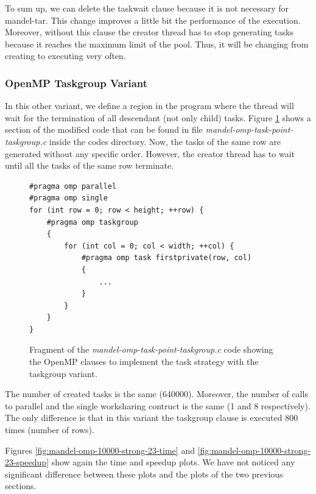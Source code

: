 \documentclass[12pt, a4paper]{article}
\begin{document}
To sum up, we can delete the taskwait clause because it is not necessary for mandel-tar. This change improves a little bit the performance of the execution. Moreover, without this clause the creator thread has to stop generating tasks because it reaches the maximum limit of the pool. Thus, it will be changing from creating to executing very often.

\subsubsection{OpenMP Taskgroup Variant}

In this other variant, we define a region in the program where the thread will wait for the termination of all descendant (not only child) tasks. Figure \ref{code:task_implementation_point_taskgroup} shows a section of the modified code that can be found in file \textit{mandel-omp-task-point-taskgroup.c} inside the codes directory. Now, the tasks of the same row are generated without any specific order. However, the creator thread has to wait until all the tasks of the same row terminate.

\begin{figure}[H]
\begin{lstlisting}
#pragma omp parallel
#pragma omp single
for (int row = 0; row < height; ++row) {
	#pragma omp taskgroup
	{
		for (int col = 0; col < width; ++col) {
        	#pragma omp task firstprivate(row, col)
        	{
        		...
			}
		}
	}
}
\end{lstlisting}
\caption{Fragment of the \textit{mandel-omp-task-point-taskgroup.c} code showing the OpenMP clauses to implement the task strategy with the taskgroup variant.}
\label{code:task_implementation_point_taskgroup}
\end{figure}

The number of created tasks is the same (640000). Moreover, the number of calls to parallel and the single worksharing contruct is the same (1 and 8 respectively). The only difference is that in this variant the taskgroup clause is executed 800 times (number of rows).

Figures \ref{fig:mandel-omp-10000-strong-23-time} and \ref{fig:mandel-omp-10000-strong-23-speedup} show again the time and speedup plots. We have not noticed any significant difference between these plots and the plots of the two previous sections.
\end{document}
